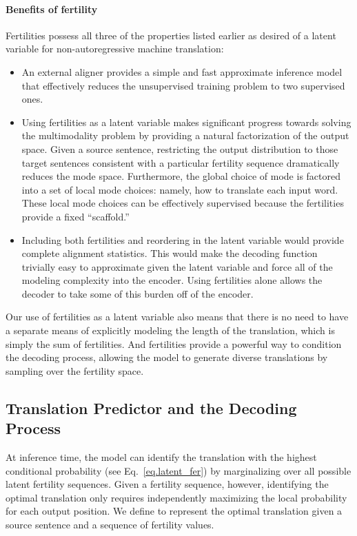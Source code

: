 \documentclass{article} \usepackage{iclr2018_conference,times}
\begin{document}
\vspace{-5pt}
\paragraph{Benefits of fertility} 
Fertilities possess all three of the properties listed earlier as desired of a latent variable for non-autoregressive machine translation:
\begin{itemize}[leftmargin=*]
\item An external aligner provides a simple and fast approximate inference model that effectively reduces the unsupervised training problem to two supervised ones.
\item Using fertilities as a latent variable makes significant progress towards solving the multimodality problem by providing a natural factorization of the output space.
Given a source sentence, restricting the output distribution to those target sentences consistent with a particular fertility sequence dramatically reduces the mode space. Furthermore, the global choice of mode is factored into a set of local mode choices: namely, how to translate each input word. These local mode choices can be effectively supervised because the fertilities provide a fixed ``scaffold.''
\item Including both fertilities and reordering in the latent variable would provide complete alignment statistics. This would make the decoding function trivially easy to approximate given the latent variable and force all of the modeling complexity into the encoder. Using fertilities alone allows the decoder to take some of this burden off of the encoder.
\end{itemize}
Our use of fertilities as a latent variable also means that there is no need to have a separate means of explicitly modeling the length of the translation, which is simply the sum of fertilities.
And fertilities provide a powerful way to condition the decoding process, allowing the model to generate diverse translations by sampling over the fertility space.

\subsection{Translation Predictor and the Decoding Process}
At inference time, the model can identify the translation with the highest conditional probability (see Eq.~\ref{eq.latent_fer}) by marginalizing over all possible latent fertility sequences. 
Given a fertility sequence, however, identifying the optimal translation only requires independently maximizing the local probability for each output position.
We define  to represent the optimal translation given a source sentence and a sequence of fertility values.
\end{document}
